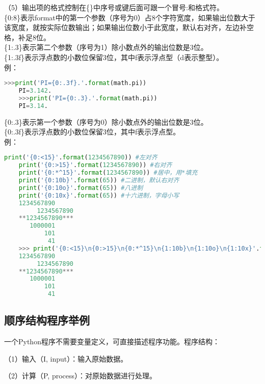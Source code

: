 \documentclass[11pt,a4paper]{article}
\begin{document}
（5）输出项的格式控制在\{\}中序号或键后面可跟一个冒号:和格式符。\\
\{0:8\}表示format中的第一个参数（序号为0）占8个字符宽度，如果输出位数大于该宽度，就按实际位数输出；如果输出位数小于此宽度，默认右对齐，左边补空格，补足8位。\\
\{1:.3\}表示第二个参数（序号为1）除小数点外的输出位数是3位。\\
\{1:.3f\}表示浮点数的小数位保留3位，其中f表示浮点型（d表示整型）。 \\
例：
\newpage
\begin{lstlisting}[language={Python}]
    >>>print('PI={0:.3f}.'.format(math.pi))
    PI=3.142.
    >>>print('PI={0:.3}.'.format(math.pi))
    PI=3.14.
\end{lstlisting}
\{0:.3\}表示第一个参数（序号为0）除小数点外的输出位数是3位。\\
\{0:.3f\}表示浮点数的小数位保留3位，其中f表示浮点型。\\
例：
\begin{lstlisting}[language={Python}]
    print('{0:<15}'.format(1234567890)) #左对齐
    print('{0:>15}'.format(1234567890)) #右对齐
    print('{0:*^15}'.format(1234567890)) #居中，用*填充
    print('{0:10b}'.format(65)) #二进制，默认右对齐
    print('{0:10o}'.format(65)) #八进制
    print('{0:10x}'.format(65)) #十六进制，字母小写   
    1234567890     
         1234567890
    **1234567890***
       1000001     
           101     
            41
    >>> print('{0:<15}\n{0:>15}\n{0:*^15}\n{1:10b}\n{1:10o}\n{1:10x}'.format(1234567890,65))
    1234567890     
         1234567890
    **1234567890***
       1000001     
           101     
            41    
\end{lstlisting}

\subsection{顺序结构程序举例}

一个Python程序不需要变量定义，可直接描述程序功能。程序结构：

（1）输入（I, input）：输入原始数据。

（2）计算（P, process）：对原始数据进行处理。
\end{document}
